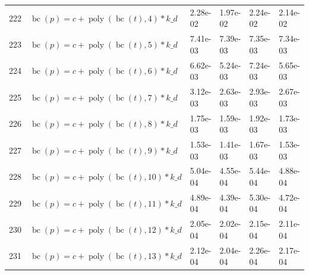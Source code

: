 \documentclass[12pt,a4paper]{article}
\DeclareMathOperator{\bc}{bc}
\DeclareMathOperator{\poly}{poly}
\begin{document}
\begin{longtable}[t]{ll>{\raggedleft\arraybackslash}p{2cm}>{\raggedleft\arraybackslash}p{2cm}>{\raggedleft\arraybackslash}p{2cm}>{\raggedleft\arraybackslash}p{2cm}}
222 & $\bc(p) = c + \poly\left( \bc(t), 4 \right) * k\_d$ & 2.28e-02 & 1.97e-02 & 2.24e-02 & 2.14e-02\\
\rowcolor{gray!6}  223 & $\bc(p) = c + \poly\left( \bc(t), 5 \right) * k\_d$ & 7.41e-03 & 7.39e-03 & 7.35e-03 & 7.34e-03\\
224 & $\bc(p) = c + \poly\left( \bc(t), 6 \right) * k\_d$ & 6.62e-03 & 5.24e-03 & 7.24e-03 & 5.65e-03\\
\rowcolor{gray!6}  225 & $\bc(p) = c + \poly\left( \bc(t), 7 \right) * k\_d$ & 3.12e-03 & 2.63e-03 & 2.93e-03 & 2.67e-03\\
226 & $\bc(p) = c + \poly\left( \bc(t), 8 \right) * k\_d$ & 1.75e-03 & 1.59e-03 & 1.92e-03 & 1.73e-03\\
\rowcolor{gray!6}  227 & $\bc(p) = c + \poly\left( \bc(t), 9 \right) * k\_d$ & 1.53e-03 & 1.41e-03 & 1.67e-03 & 1.53e-03\\
228 & $\bc(p) = c + \poly\left( \bc(t), 10 \right) * k\_d$ & 5.04e-04 & 4.55e-04 & 5.44e-04 & 4.88e-04\\
\rowcolor{gray!6}  229 & $\bc(p) = c + \poly\left( \bc(t), 11 \right) * k\_d$ & 4.89e-04 & 4.39e-04 & 5.30e-04 & 4.72e-04\\
230 & $\bc(p) = c + \poly\left( \bc(t), 12 \right) * k\_d$ & 2.05e-04 & 2.02e-04 & 2.15e-04 & 2.11e-04\\
\rowcolor{gray!6}  231 & $\bc(p) = c + \poly\left( \bc(t), 13 \right) * k\_d$ & 2.12e-04 & 2.04e-04 & 2.26e-04 & 2.17e-04\\*
\end{longtable}
\endgroup{}

\begingroup\fontsize{10}{12}\selectfont
\end{document}
